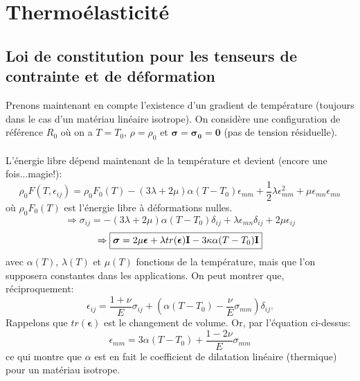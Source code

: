 \section{Thermoélasticité}
\subsection{Loi de constitution pour les tenseurs de contrainte et de déformation}
Prenons maintenant en compte l'existence d'un gradient de température (toujours dans le cas d'un matériau linéaire isotrope). On considère une configuration de référence $R_0$ où on a $T=T_0$, $\rho=\rho_0$ et $\boldsymbol{\sigma}=\boldsymbol{\sigma_0}=\mathbf{0}$ (pas de tension résiduelle).
\paragraph{}
L'énergie libre dépend maintenant de la température et devient (encore une fois...magie!):
$$\rho_0F(T,\epsilon_{ij})=\rho_0F_0(T)-(3\lambda+2\mu)\alpha(T-T_0)\epsilon_{mm}+\frac{1}{2}\lambda\epsilon_{mm}^2+\mu\epsilon_{mn}\epsilon_{mn}$$
où $\rho_0F_0(T)$ est l'énergie libre à déformations nulles.
$$\Rightarrow\sigma_{ij}=-(3\lambda+2\mu)\alpha(T-T_0)\delta_{ij}+\lambda\epsilon_{mn}\delta_{ij}+2\mu\epsilon_{ij}$$
$$\Rightarrow\boxed{\boldsymbol{\sigma}=2\mu\boldsymbol{\epsilon}+\lambda tr(\boldsymbol{\epsilon})\textbf{I}-3\kappa\alpha(T-T_0)\textbf{I}}$$
avec $\alpha(T)$, $\lambda(T)$ et $\mu(T)$ fonctions de la température, mais que l'on supposera constantes dans les applications. On peut montrer que, réciproquement:
$$\epsilon_{ij}=\frac{1+\nu}{E}\sigma_{ij}+\left(\alpha(T-T_0)-\frac{\nu}{E}\sigma_{mm}\right)\delta_{ij}.$$ Rappelons que $tr(\boldsymbol{\epsilon})$ est le changement de volume. Or, par l'équation ci-dessus:
$$\epsilon_{mm}=3\alpha(T-T_0)+\frac{1-2\nu}{E}\sigma_{mm}$$ ce qui montre que $\alpha$ est en fait le coefficient de dilatation linéaire (thermique) pour un matériau isotrope.
